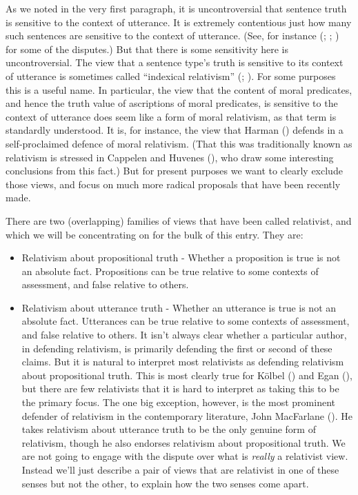 \documentclass[
  10pt,
  letterpaper,
  DIV=11,
  numbers=noendperiod,
  twoside]{scrartcl}
\providecommand{\tightlist}{%
  \setlength{\itemsep}{0pt}\setlength{\parskip}{0pt}}\usepackage{longtable,booktabs,array}
\begin{document}
As we noted in the very first paragraph, it is uncontroversial that
sentence truth is sensitive to the context of utterance. It is extremely
contentious just how many such sentences are sensitive to the context of
utterance. (See, for instance (;
;
) for some of the
disputes.) But that there is some sensitivity here is uncontroversial.
The view that a sentence type's truth is sensitive to its context of
utterance is sometimes called ``indexical relativism''
(;
). For some purposes this is
a useful name. In particular, the view that the content of moral
predicates, and hence the truth value of ascriptions of moral
predicates, is sensitive to the context of utterance does seem like a
form of moral relativism, as that term is standardly understood. It is,
for instance, the view that Harman ()
defends in a self-proclaimed defence of moral relativism. (That this was
traditionally known as relativism is stressed in Cappelen and Huvenes
(), who draw some interesting
conclusions from this fact.) But for present purposes we want to clearly
exclude those views, and focus on much more radical proposals that have
been recently made.

There are two (overlapping) families of views that have been called
relativist, and which we will be concentrating on for the bulk of this
entry. They are:

\begin{itemize}
\tightlist
\item
  Relativism about propositional truth - Whether a proposition is true
  is not an absolute fact. Propositions can be true relative to some
  contexts of assessment, and false relative to others.
\item
  Relativism about utterance truth - Whether an utterance is true is not
  an absolute fact. Utterances can be true relative to some contexts of
  assessment, and false relative to others. It isn't always clear
  whether a particular author, in defending relativism, is primarily
  defending the first or second of these claims. But it is natural to
  interpret most relativists as defending relativism about propositional
  truth. This is most clearly true for Kölbel
  () and Egan
  (), but there are few relativists
  that it is hard to interpret as taking this to be the primary focus.
  The one big exception, however, is the most prominent defender of
  relativism in the contemporary literature, John MacFarlane
  (). He takes relativism about
  utterance truth to be the only genuine form of relativism, though he
  also endorses relativism about propositional truth. We are not going
  to engage with the dispute over what is \emph{really} a relativist
  view. Instead we'll just describe a pair of views that are relativist
  in one of these senses but not the other, to explain how the two
  senses come apart.
\end{itemize}
\end{document}
